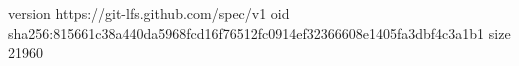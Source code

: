 version https://git-lfs.github.com/spec/v1
oid sha256:815661c38a440da5968fcd16f76512fc0914ef32366608e1405fa3dbf4c3a1b1
size 21960
